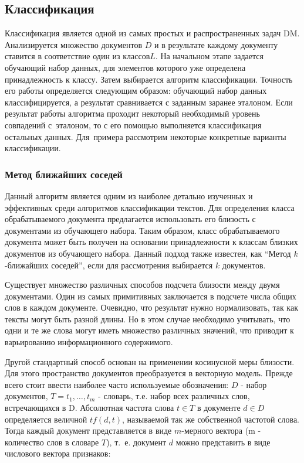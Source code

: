 \subsection{Классификация}

Классификация является одной из самых простых и распространенных задач DM. 
Анализируется множество документов $D$ и в результате каждому документу
ставится в соответствие один из классов$L$.  На начальном этапе
задается обучающий набор данных, для элементов которого уже
определена принадлежность к классу. 
Затем выбирается алгоритм классификации. 
Точность его работы определяется следующим образом:
обучающий набор данных классифицируется, а результат сравнивается с заданным заранее эталоном.
Если результат работы алгоритма проходит некоторый необходимый уровень совпадений с~эталоном, 
то с его помощью выполняется классификация остальных данных.  
Для~примера рассмотрим некоторые конкретные варианты классификации.

\subsubsection{Метод ближайших соседей}

Данный алгоритм является одним из наиболее детально изученных и эффективных среди
алгоритмов классификации текстов.
Для определения класса обрабатываемого документа предлагается использовать 
его близость с документами из обучающего набора. Таким образом, класс обрабатываемого
документа может быть получен на основании принадлежности к классам близких документов
из обучающего набора. 
Данный подход также известен, как ``Метод $k$-ближайших соседей'', 
если для рассмотрения выбирается $k$ документов.

Существует множество различных способов подсчета близости между двумя документами.
Один из самых примитивных заключается в подсчете числа общих слов в каждом документе.
Очевидно, что результат нужно нормализовать, так как тексты могут быть разной длины.
Но в этом случае необходимо учитывать, что одни и те же слова могут иметь множество
различных значений, что приводит к варьированию информационного содержимого.

Другой стандартный способ основан на применении косинусной меры близости. Для этого пространство 
документов преобразуется в векторную модель. Прежде всего стоит ввести наиболее часто используемые
обозначения: $D$ - набор документов, $T = {t_1, \dots, t_m}$ - словарь, т.е. набор всех различных слов,
встречающихся в D. Абсолютная частота слова $t \in T$ в документе $d \in D$ определяется величной
$tf(d,t)$, называемой так же собственной частотой слова.  
Тогда каждый документ представляется в виде $m$-мерного вектора (m - количество слов в словаре $T$),
т.~е. документ $d$ можно представить в виде числового вектора признаков: 


